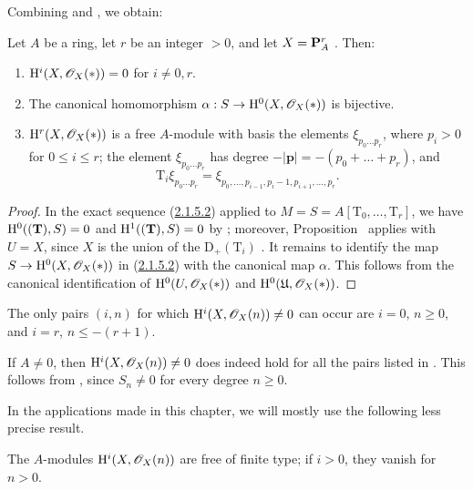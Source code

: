 Combining  and , we obtain:

\begin{proposition}[2.1.12]
\label{III.2.1.12}
Let $A$ be a ring, let $r$ be an integer $>0$, and let $X=\mathbf{P}_A^r$ .
Then:
\begin{enumerate}
  \item[{\rm(i)}] $\mathrm{H}^i(X,\mathscr{O}_X(*))=0$ for $i\neq0,r$.
  \item[{\rm(ii)}] The canonical homomorphism $\alpha:S\to\mathrm{H}^0(X,\mathscr{O}_X(*))$  is bijective.
  \item[{\rm(iii)}] $\mathrm{H}^r(X,\mathscr{O}_X(*))$ is a free $A$-module with basis the elements $\xi_{p_0\ldots p_r}$, where $p_i>0$ for $0\leq i\leq r$; the element $\xi_{p_0\ldots p_r}$ has degree $-|\mathbf{p}|=-(p_0+\ldots+p_r)$, and
  \[
    \mathrm{T}_i\xi_{p_0\ldots p_r}
    =\xi_{p_0,\dots,p_{i-1},p_i-1,p_{i+1},\dots,p_r}.
  \]
\end{enumerate}
\end{proposition}

\begin{proof}
In the exact sequence (\hyperref[III.2.1.5.2]{2.1.5.2}) applied to $M=S=A[\mathrm{T}_0,\dots,\mathrm{T}_r]$, we have $\mathrm{H}^0((\mathbf{T}),S)=0$ and $\mathrm{H}^1((\mathbf{T}),S)=0$ by ; moreover, Proposition~ applies with $U=X$, since $X$ is the union of the $\mathrm{D}_+(\mathrm{T}_i)$ .
It remains to identify the map $S\to\mathrm{H}^0(X,\mathscr{O}_X(*))$ in (\hyperref[III.2.1.5.2]{2.1.5.2}) with the canonical map $\alpha$.
This follows from the canonical identification of $\mathrm{H}^0(U,\mathscr{O}_X(*))$ and $\mathrm{H}^0(\mathfrak{U},\mathscr{O}_X(*))$.
\end{proof}

\begin{corollary}[2.1.13]
\label{III.2.1.13}
The only pairs $(i,n)$ for which $\mathrm{H}^i(X,\mathscr{O}_X(n))\neq0$ can occur are $i=0$, $n\geq0$, and $i=r$, $n\leq-(r+1)$.
\end{corollary}

If $A\neq0$, then $\mathrm{H}^i(X,\mathscr{O}_X(n))\neq0$ does indeed hold for all the pairs listed in .
This follows from , since $S_n\neq0$ for every degree $n\geq0$.

In the applications made in this chapter, we will mostly use the following less precise result.

\begin{corollary}[2.1.14]
\label{III.2.1.14}
The $A$-modules $\mathrm{H}^i(X,\mathscr{O}_X(n))$ are free of finite type; if $i>0$, they vanish for $n>0$.
\end{corollary}

